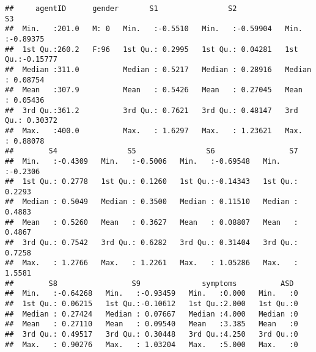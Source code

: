 \documentclass[]{article}
\begin{document}
\begin{verbatim}
##     agentID      gender       S1                S2                 S3          
##  Min.   :201.0   M: 0   Min.   :-0.5510   Min.   :-0.59904   Min.   :-0.89375  
##  1st Qu.:260.2   F:96   1st Qu.: 0.2995   1st Qu.: 0.04281   1st Qu.:-0.15777  
##  Median :311.0          Median : 0.5217   Median : 0.28916   Median : 0.08754  
##  Mean   :307.9          Mean   : 0.5426   Mean   : 0.27045   Mean   : 0.05436  
##  3rd Qu.:361.2          3rd Qu.: 0.7621   3rd Qu.: 0.48147   3rd Qu.: 0.30372  
##  Max.   :400.0          Max.   : 1.6297   Max.   : 1.23621   Max.   : 0.88078  
##        S4                S5                S6                 S7         
##  Min.   :-0.4309   Min.   :-0.5006   Min.   :-0.69548   Min.   :-0.2306  
##  1st Qu.: 0.2778   1st Qu.: 0.1260   1st Qu.:-0.14343   1st Qu.: 0.2293  
##  Median : 0.5049   Median : 0.3500   Median : 0.11510   Median : 0.4883  
##  Mean   : 0.5260   Mean   : 0.3627   Mean   : 0.08807   Mean   : 0.4867  
##  3rd Qu.: 0.7542   3rd Qu.: 0.6282   3rd Qu.: 0.31404   3rd Qu.: 0.7258  
##  Max.   : 1.2766   Max.   : 1.2261   Max.   : 1.05286   Max.   : 1.5581  
##        S8                 S9              symptoms          ASD   
##  Min.   :-0.64268   Min.   :-0.93459   Min.   :0.000   Min.   :0  
##  1st Qu.: 0.06215   1st Qu.:-0.10612   1st Qu.:2.000   1st Qu.:0  
##  Median : 0.27424   Median : 0.07667   Median :4.000   Median :0  
##  Mean   : 0.27110   Mean   : 0.09540   Mean   :3.385   Mean   :0  
##  3rd Qu.: 0.49517   3rd Qu.: 0.30448   3rd Qu.:4.250   3rd Qu.:0  
##  Max.   : 0.90276   Max.   : 1.03204   Max.   :5.000   Max.   :0
\end{verbatim}
\end{document}
